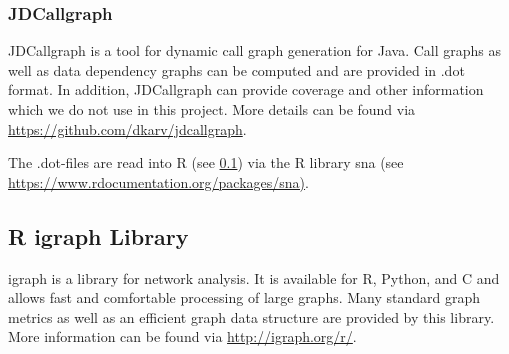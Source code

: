 \subsubsection{JDCallgraph}
\label{sec:jdcallgraph}

JDCallgraph is a tool for dynamic call graph generation for Java. Call graphs as
well as data dependency graphs can be computed and are provided in .dot format.
In addition, JDCallgraph can provide coverage and other information which we do
not use in this project. More details can be found via
\url{https://github.com/dkarv/jdcallgraph}.

The .dot-files are read into R (see \ref{sec:igraph}) via the R library sna (see
\url{https://www.rdocumentation.org/packages/sna)}.

\subsection{R igraph Library}
\label{sec:igraph}

igraph is a library for network analysis. It is available for R, Python, and C
and allows fast and comfortable processing of large graphs. Many standard graph
metrics as well as an efficient graph data structure  are provided by this
library. More information can be found via \url{http://igraph.org/r/}.
